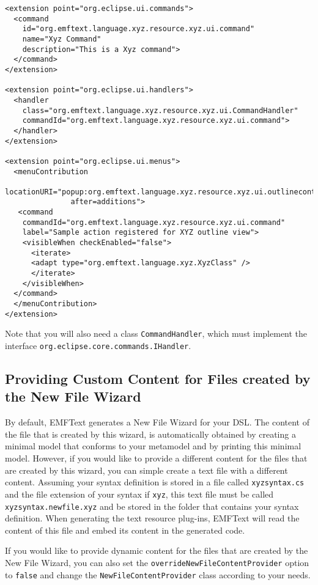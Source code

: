 \lstset{language=XML}
\begin{lstlisting}
<extension point="org.eclipse.ui.commands">
  <command
    id="org.emftext.language.xyz.resource.xyz.ui.command"
    name="Xyz Command"
    description="This is a Xyz command">
  </command>
</extension>

<extension point="org.eclipse.ui.handlers">
  <handler
    class="org.emftext.language.xyz.resource.xyz.ui.CommandHandler"
    commandId="org.emftext.language.xyz.resource.xyz.ui.command">
  </handler>
</extension>

<extension point="org.eclipse.ui.menus">
  <menuContribution 
  locationURI="popup:org.emftext.language.xyz.resource.xyz.ui.outlinecontext?
               after=additions">
   <command
    commandId="org.emftext.language.xyz.resource.xyz.ui.command"
    label="Sample action registered for XYZ outline view">
    <visibleWhen checkEnabled="false">
      <iterate>
      <adapt type="org.emftext.language.xyz.XyzClass" />
      </iterate>
    </visibleWhen>
  </command>
  </menuContribution>
</extension>
\end{lstlisting}

Note that you will also need a class \texttt{CommandHandler}, which must
implement the interface \texttt{org.eclipse.core.commands.IHandler}.

\subsection{Providing Custom Content for Files created by the New File Wizard}

By default, EMFText generates a New File Wizard for your DSL. The content of the
file that is created by this wizard, is automatically obtained by creating a
minimal model that conforms to your metamodel and by printing this minimal
model. However, if you would like to provide a different content for the files
that are created by this wizard, you can simple create a text file with a
different content. Assuming your syntax definition is stored in a file called
\texttt{xyzsyntax.cs} and the file extension of your syntax if
\texttt{xyz}, this text file must be called \texttt{xyzsyntax.newfile.xyz} and
be stored in the folder that contains your syntax definition.
When generating the text resource plug-ins, EMFText will read the content of
this file and embed its content in the generated code.

If you would like to provide dynamic content for the files that are created by
the New File Wizard, you can also set the
\texttt{overrideNewFileContentProvider} option to \texttt{false} and change the
\texttt{NewFileContentProvider} class according to your needs.
